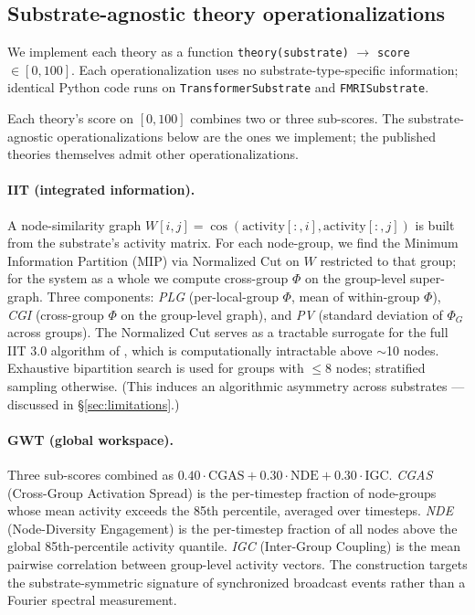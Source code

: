 \documentclass[11pt,a4paper]{article}
\begin{document}
\subsection{Substrate-agnostic theory operationalizations}

We implement each theory as a function \texttt{theory(substrate)} $\rightarrow$ \texttt{score} $\in [0, 100]$. Each operationalization uses no substrate-type-specific information; identical Python code runs on \texttt{TransformerSubstrate} and \texttt{FMRISubstrate}.

Each theory's score on $[0, 100]$ combines two or three sub-scores. The substrate-agnostic operationalizations below are the ones we implement; the published theories themselves admit other operationalizations.

\paragraph{IIT (integrated information).} A node-similarity graph $W[i,j] = \cos(\text{activity}[:,i], \text{activity}[:,j])$ is built from the substrate's activity matrix. For each node-group, we find the Minimum Information Partition (MIP) via Normalized Cut \citep{shi2000normalized} on $W$ restricted to that group; for the system as a whole we compute cross-group $\Phi$ on the group-level super-graph. Three components: \emph{PLG} (per-local-group $\Phi$, mean of within-group $\Phi$), \emph{CGI} (cross-group $\Phi$ on the group-level graph), and \emph{PV} (standard deviation of $\Phi_G$ across groups). The Normalized Cut serves as a tractable surrogate for the full IIT 3.0 algorithm of \citet{oizumi2014phenomenology}, which is computationally intractable above $\sim$10 nodes. Exhaustive bipartition search is used for groups with $\leq 8$ nodes; stratified sampling otherwise. (This induces an algorithmic asymmetry across substrates --- discussed in \S\ref{sec:limitations}.)

\paragraph{GWT (global workspace).} Three sub-scores combined as $0.40 \cdot \text{CGAS} + 0.30 \cdot \text{NDE} + 0.30 \cdot \text{IGC}$. \emph{CGAS} (Cross-Group Activation Spread) is the per-timestep fraction of node-groups whose mean activity exceeds the 85th percentile, averaged over timesteps. \emph{NDE} (Node-Diversity Engagement) is the per-timestep fraction of all nodes above the global 85th-percentile activity quantile. \emph{IGC} (Inter-Group Coupling) is the mean pairwise correlation between group-level activity vectors. The construction targets the substrate-symmetric signature of synchronized broadcast events rather than a Fourier spectral measurement.
\end{document}
